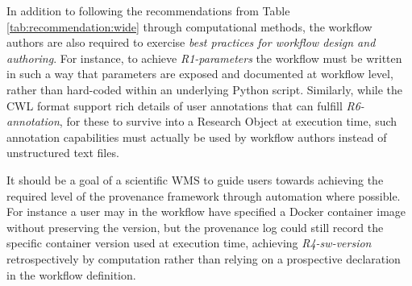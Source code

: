 \documentclass[a4paper,num-refs]{oup-contemporary}
\begin{document}
In addition to following the recommendations from Table \ref{tab:recommendation:wide} through computational methods, the workflow authors are also required to exercise \textit{best practices for workflow design and authoring}. For instance, to achieve \textit{R1-parameters} the workflow must be written in such a way that parameters are exposed and documented at workflow level, rather than hard-coded within an underlying Python script. Similarly, while the CWL format support rich details of user annotations that can fulfill \textit{R6-annotation}, for these to survive into a Research Object at execution time, such annotation capabilities must actually be used by workflow authors instead of unstructured text files. 

It should be a goal of a scientific WMS to guide users towards achieving the required level of the provenance framework through automation where possible. For instance a user may in the workflow have specified a Docker container image without preserving the version, but the provenance log could still record the specific container version used at execution time, achieving \textit{R4-sw-version} retrospectively by computation rather than relying on a prospective declaration in the workflow definition.
\end{document}
